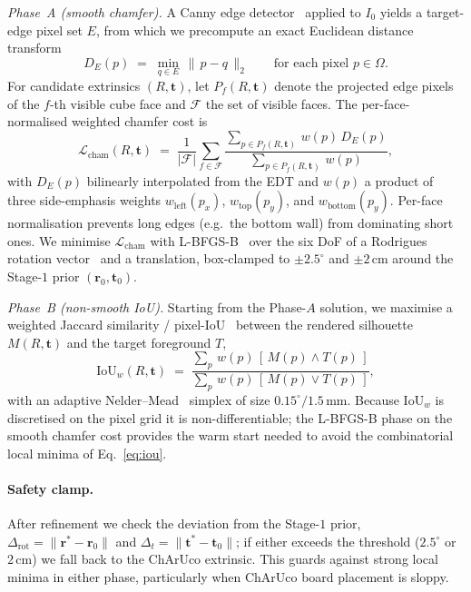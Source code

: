 \emph{Phase~A (smooth chamfer).}
A Canny edge detector~\cite{canny1986computational} applied to
$I_{0}$ yields a target-edge pixel set $E$, from which we
precompute an exact Euclidean distance
transform~\cite{maurer2003linear,borgefors1986distance}
\begin{equation}
\label{eq:edt}
    D_{E}(p) \;=\;
    \min_{q \in E}\,\|\,p - q\,\|_{2}
    \qquad \text{for each pixel } p \in \Omega.
\end{equation}
For candidate extrinsics $(R, \mathbf{t})$, let $P_{f}(R, \mathbf{t})$
denote the projected edge pixels of the $f$-th visible cube face
and $\mathcal{F}$ the set of visible faces. The per-face-normalised
weighted chamfer cost is
\begin{equation}
\label{eq:chamfer}
    \mathcal{L}_{\mathrm{cham}}(R, \mathbf{t})
    \;=\;
    \frac{1}{|\mathcal{F}|}
    \sum_{f \in \mathcal{F}}
    \frac{\sum_{p \in P_{f}(R,\mathbf{t})}\, w(p)\, D_{E}(p)}
         {\sum_{p \in P_{f}(R,\mathbf{t})}\, w(p)},
\end{equation}
with $D_{E}(p)$ bilinearly interpolated from the EDT and
$w(p)$ a product of three side-emphasis weights
$w_{\mathrm{left}}(p_{x})$, $w_{\mathrm{top}}(p_{y})$, and
$w_{\mathrm{bottom}}(p_{y})$.
Per-face normalisation prevents long edges (e.g.\ the bottom wall)
from dominating short ones. We minimise $\mathcal{L}_{\mathrm{cham}}$
with L-BFGS-B~\cite{byrd1995limited,zhu1997algorithm} over the six
DoF of a Rodrigues rotation vector~\cite{rodrigues1840lois} and a
translation, box-clamped to $\pm 2.5^{\circ}$ and $\pm 2$\,cm around
the Stage-$1$ prior $(\mathbf{r}_{0}, \mathbf{t}_{0})$.

\emph{Phase~B (non-smooth IoU).}
Starting from the Phase-$A$ solution, we maximise a weighted Jaccard
similarity / pixel-IoU~\cite{jaccard1912distribution} between the
rendered silhouette $M(R, \mathbf{t})$ and the target foreground $T$,
\begin{equation}
\label{eq:iou}
    \mathrm{IoU}_{w}(R, \mathbf{t})
    \;=\;
    \frac{\sum_{p}\, w(p)\,[\,M(p)\wedge T(p)\,]}
         {\sum_{p}\, w(p)\,[\,M(p)\vee T(p)\,]},
\end{equation}
with an adaptive Nelder--Mead~\cite{gao2012implementing} simplex of
size $0.15^{\circ}/1.5$\,mm. Because $\mathrm{IoU}_{w}$ is
discretised on the pixel grid it is non-differentiable; the
L-BFGS-B phase on the smooth chamfer cost provides the warm start
needed to avoid the combinatorial local minima of
Eq.~\eqref{eq:iou}.

\paragraph{Safety clamp.}
After refinement we check the deviation from the Stage-$1$ prior,
$\Delta_{\mathrm{rot}} = \|\mathbf{r}^{*} - \mathbf{r}_{0}\|$ and
$\Delta_{t} = \|\mathbf{t}^{*} - \mathbf{t}_{0}\|$; if either
exceeds the threshold ($2.5^{\circ}$ or $2$\,cm) we fall back to
the ChArUco extrinsic. This guards against strong local minima in
either phase, particularly when ChArUco board placement is sloppy.

